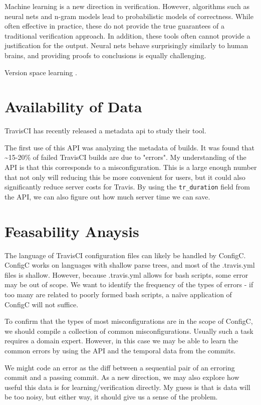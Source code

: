 \documentclass{sigplanconf}
\begin{document}
Machine learning is a new direction in verification\cite{Santolucito2016,ETH_Guy}.
However, algorithms such as neural nets and n-gram models lead to probabilistic models of correctness.
While often effective in practice, these do not provide the true guarantees of a traditional verification approach.
In addition, these tools often cannot provide a justification for the output.
Neural nets behave surprisingly similarly to human brains, and providing proofs to conclusions is equally challenging.

Version space learning \cite{lau2000version}.


\section{Availability of Data}

TravisCI has recently released a metadata api to study their tool\cite{API}.

The first use of this API was analyzing the metadata of builds. It was found that \textasciitilde 15-20\% of failed TravisCI builds are due to "errors". My understanding of the API is that this corresponds to a misconfiguration. This is a large enough number that not only will reducing this be more convenient for users, but it could also significantly reduce server costs for Travis. By using the \verb|tr_duration| field from the API, we can also figure out how much server time we can save\cite{API}.


\section{Feasability Anaysis}
\label{sec:feas}

The language of TravisCI configuration files can likely be handled by ConfigC.
ConfigC works on languages with shallow parse trees, and most of the .travis.yml files is shallow.
However, because .travis.yml allows for bash scripts, some error may be out of scope.
We want to identify the frequency of the types of errors - if too many are related to poorly formed bash scripts, a naïve application of ConfigC will not suffice.

To confirm that the types of most misconfigurations are in the scope of ConfigC, we should compile a collection of common misconfigurations.
Usually such a task requires a domain expert.
However, in this case we may be able to learn the common errors by using the API and the temporal data from the commits.

We might code an error as the diff between a sequential pair of an erroring commit and a passing commit.
As a new direction, we may also explore how useful this data is for learning/verification directly.
My guess is that is data will be too noisy, but either way, it should give us a sense of the problem.
\end{document}
